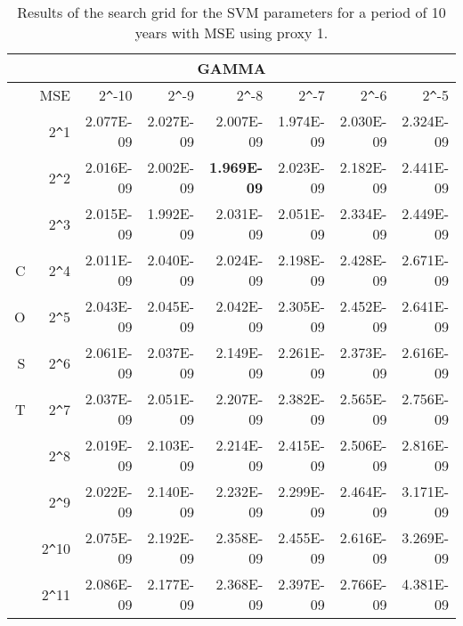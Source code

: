 \begin{table}[h!]
\centering
\begin{adjustbox}{width=\textwidth}
\begin{tabular}{|r|r|rrrrrr|}
\hline
\multicolumn{8}{|c|}{GAMMA} \tabularnewline
\hline
  &MSE& 2\verb|^|-10 & 2\verb|^|-9 & 2\verb|^|-8 & 2\verb|^|-7 & 2\verb|^|-6 & 2\verb|^|-5 \\ 
  \hline
  &2\verb|^|1 & 2.077E-09 & 2.027E-09 & 2.007E-09 & 1.974E-09 & 2.030E-09 & 2.324E-09 \\ 
  &2\verb|^|2 & 2.016E-09 & 2.002E-09 & \textbf{1.969E-09} & 2.023E-09 & 2.182E-09 & 2.441E-09 \\ 
  &2\verb|^|3 & 2.015E-09 & 1.992E-09 & 2.031E-09 & 2.051E-09 & 2.334E-09 & 2.449E-09 \\ 
  C&2\verb|^|4 & 2.011E-09 & 2.040E-09 & 2.024E-09 & 2.198E-09 & 2.428E-09 & 2.671E-09 \\ 
  O&2\verb|^|5 & 2.043E-09 & 2.045E-09 & 2.042E-09 & 2.305E-09 & 2.452E-09 & 2.641E-09 \\ 
  S&2\verb|^|6 & 2.061E-09 & 2.037E-09 & 2.149E-09 & 2.261E-09 & 2.373E-09 & 2.616E-09 \\ 
  T&2\verb|^|7 & 2.037E-09 & 2.051E-09 & 2.207E-09 & 2.382E-09 & 2.565E-09 & 2.756E-09 \\ 
  &2\verb|^|8 & 2.019E-09 & 2.103E-09 & 2.214E-09 & 2.415E-09 & 2.506E-09 & 2.816E-09 \\ 
  &2\verb|^|9 & 2.022E-09 & 2.140E-09 & 2.232E-09 & 2.299E-09 & 2.464E-09 & 3.171E-09 \\ 
  &2\verb|^|10 & 2.075E-09 & 2.192E-09 & 2.358E-09 & 2.455E-09 & 2.616E-09 & 3.269E-09 \\ 
  &2\verb|^|11 & 2.086E-09 & 2.177E-09 & 2.368E-09 & 2.397E-09 & 2.766E-09 & 4.381E-09 \\ 
   \hline
\end{tabular}
\end{adjustbox}
\caption{Results of the search grid for the SVM parameters for a period of 10 years with MSE using proxy 1.}
\end{table}